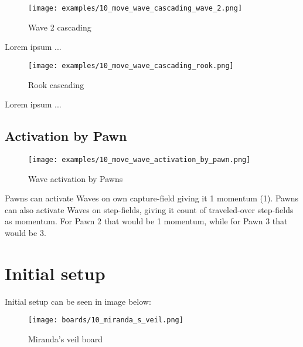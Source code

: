 \vspace*{60.0mm}
\noindent
\begin{wrapfigure}[1]{r}{0.4375\textwidth}
\texttt{[image: examples/10\_move\_wave\_cascading\_wave\_2.png]}
\caption{Wave 2 cascading}
\label{fig:mv_wave_2_cascading}
\end{wrapfigure}
Lorem ipsum ...

\clearpage %

\noindent
\begin{wrapfigure}[1]{l}{0.4375\textwidth}
\texttt{[image: examples/10\_move\_wave\_cascading\_rook.png]}
\caption{Rook cascading}
\label{fig:mv_rook_cascading}
\end{wrapfigure}
Lorem ipsum ...


\clearpage %

\subsection*{Activation by Pawn}

\noindent
\begin{figure}[!h]
\texttt{[image: examples/10\_move\_wave\_activation\_by\_pawn.png]}
\caption{Wave activation by Pawns}
\label{fig:wave_activation_by_pawns}
\end{figure}

Pawns can activate Waves on own capture-field giving it 1 momentum (1).
Pawns can also activate Waves on step-fields, giving it count of traveled-over
step-fields as momentum. For Pawn 2 that would be 1 momentum, while for Pawn 3
that would be 3.

\clearpage %

\section*{Initial setup}

Initial setup can be seen in image below:

\noindent
\begin{figure}[h]
\texttt{[image: boards/10\_miranda\_s\_veil.png]}
\caption{Miranda's veil board}
\label{fig:miranda_s_veil}
\end{figure}

\clearpage %
